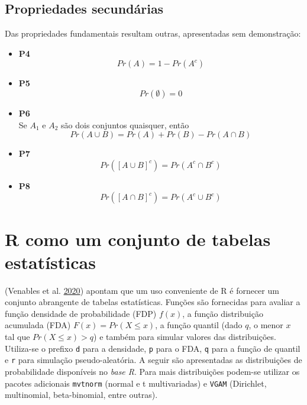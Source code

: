 \documentclass[
]{book}
\theoremstyle{definition}
\theoremstyle{definition}
\theoremstyle{definition}
\theoremstyle{remark}
\begin{document}
\hypertarget{propriedades-secunduxe1rias}{%
\subsection{Propriedades secundárias}\label{propriedades-secunduxe1rias}}

Das propriedades fundamentais resultam outras, apresentadas sem demonstração:

\begin{itemize}
\item
  \textbf{P4}\\
  \begin{equation}
  Pr(A)=1-Pr(A^c) 
  \label{eq:def-p4}
  \end{equation}
\item
  \textbf{P5}\\
  \begin{equation}
  Pr(\emptyset)=0 
  \label{eq:def-p5}
  \end{equation}
\item
  \textbf{P6}\\
  Se \(A_1\) e \(A_2\) são dois conjuntos quaisquer, então
  \begin{equation} 
  Pr(A \cup B) = Pr(A) + Pr(B) - Pr(A \cap B)
  \label{eq:def-p6}
  \end{equation}
\item
  \textbf{P7}\\
  \begin{equation}
  Pr(\left[ A \cup B \right]^c) = Pr(A^c \cap B^c) 
  \label{eq:def-p7}
  \end{equation}
\item
  \textbf{P8}\\
  \begin{equation}
  Pr(\left[ A \cap B \right]^c) = Pr(A^c \cup B^c) 
  \label{eq:def-p8}
  \end{equation}
\end{itemize}

\hypertarget{r-como-um-conjunto-de-tabelas-estatuxedsticas}{%
\section{R como um conjunto de tabelas estatísticas}\label{r-como-um-conjunto-de-tabelas-estatuxedsticas}}

(Venables et al. \protect\hyperlink{ref-venables2020introduction}{2020}) apontam que um uso conveniente de R é fornecer um conjunto abrangente de tabelas estatísticas. Funções são fornecidas para avaliar a função densidade de probabilidade (FDP) \(f(x)\), a função distribuição acumulada (FDA) \(F(x) = Pr(X \le x)\), a função quantil (dado \(q\), o menor \(x\) tal que \(Pr(X \le x) > q\)) e também para simular valores das distribuições. Utiliza-se o prefixo \texttt{d} para a densidade, \texttt{p} para o FDA, \texttt{q} para a função de quantil e \texttt{r} para simulação pseudo-aleatória. A seguir são apresentadas as distribuições de probabilidade disponíveis no \emph{base R}. Para mais distribuições podem-se utilizar os pacotes adicionais \texttt{mvtnorm} (normal e t multivariadas) e \texttt{VGAM} (Dirichlet, multinomial, beta-binomial, entre outras).
\end{document}

